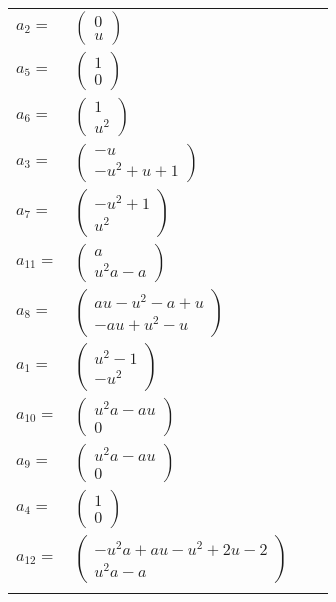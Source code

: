 \documentclass[1p]{elsarticle_modified}
\theoremstyle{definition}
\begin{document}
\begin{tabular}{m{7pt} m{180pt} m{7pt} m{180pt} }
\flushright $a_{2}=$&$\begin{pmatrix}0\\u\end{pmatrix}$ \\
\flushright $a_{5}=$&$\begin{pmatrix}1\\0\end{pmatrix}$ \\
\flushright $a_{6}=$&$\begin{pmatrix}1\\u^2\end{pmatrix}$ \\
\flushright $a_{3}=$&$\begin{pmatrix}- u\\- u^2+u+1\end{pmatrix}$ \\
\flushright $a_{7}=$&$\begin{pmatrix}- u^2+1\\u^2\end{pmatrix}$ \\
\flushright $a_{11}=$&$\begin{pmatrix}a\\u^2 a- a\end{pmatrix}$ \\
\flushright $a_{8}=$&$\begin{pmatrix}a u- u^2- a+u\\- a u+u^2- u\end{pmatrix}$ \\
\flushright $a_{1}=$&$\begin{pmatrix}u^2-1\\- u^2\end{pmatrix}$ \\
\flushright $a_{10}=$&$\begin{pmatrix}u^2 a- a u\\0\end{pmatrix}$ \\
\flushright $a_{9}=$&$\begin{pmatrix}u^2 a- a u\\0\end{pmatrix}$ \\
\flushright $a_{4}=$&$\begin{pmatrix}1\\0\end{pmatrix}$ \\
\flushright $a_{12}=$&$\begin{pmatrix}- u^2 a+a u- u^2+2 u-2\\u^2 a- a\end{pmatrix}$\\&\end{tabular}
\end{document}
